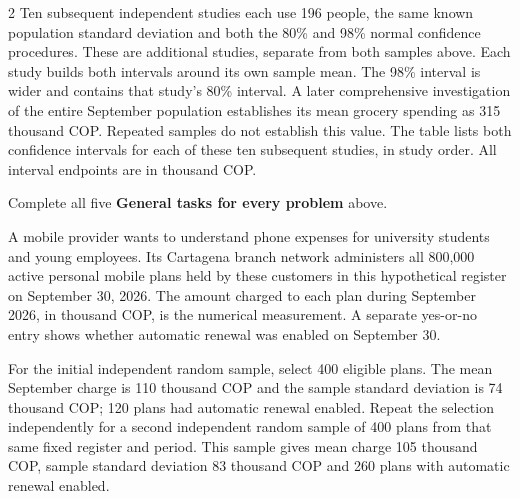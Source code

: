 \begin{multicols}{2}
Ten subsequent independent studies each use 196 people, the same known population standard deviation and both the 80\% and 98\% normal confidence procedures. These are additional studies, separate from both samples above. Each study builds both intervals around its own sample mean. The 98\% interval is wider and contains that study's 80\% interval. A later comprehensive investigation of the entire September population establishes its mean grocery spending as 315 thousand COP. Repeated samples do not establish this value. The table lists both confidence intervals for each of these ten subsequent studies, in study order. All interval endpoints are in thousand COP.


Complete all five \textbf{General tasks for every problem} above.
\endgroup

\columnbreak


A mobile provider wants to understand phone expenses for university students and young employees. Its Cartagena branch network administers all 800,000 active personal mobile plans held by these customers in this hypothetical register on September 30, 2026. The amount charged to each plan during September 2026, in thousand COP, is the numerical measurement. A separate yes-or-no entry shows whether automatic renewal was enabled on September 30.

For the initial independent random sample, select 400 eligible plans. The mean September charge is 110 thousand COP and the sample standard deviation is 74 thousand COP; 120 plans had automatic renewal enabled. Repeat the selection independently for a second independent random sample of 400 plans from that same fixed register and period. This sample gives mean charge 105 thousand COP, sample standard deviation 83 thousand COP and 260 plans with automatic renewal enabled.


\end{multicols}
